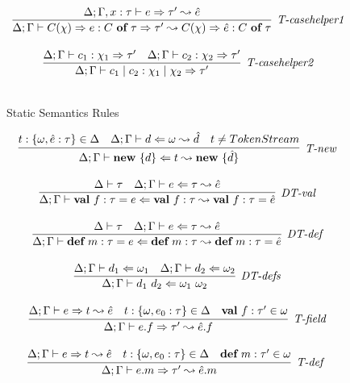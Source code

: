 \begin{figure}
\[\begin{array}{c}
\infer[\textit{T-casehelper1}]
	{\Delta; \Gamma \vdash  C(\chi)\Rightarrow e : C\ \keyw{of}\ \tau \Rightarrow \tau' \leadsto C(\chi)\Rightarrow \hat{e} : C\ \keyw{of}\ \tau} 
	{\Delta; \Gamma, x:\tau \vdash e \Rightarrow \tau' \leadsto \hat{e}}\\[3ex]

\infer[\textit{T-casehelper2}]
	{\Delta; \Gamma \vdash  c_1 \bnfalt c_2: \chi_1 \bnfalt \chi_2 \Rightarrow \tau' } 
	{\Delta; \Gamma \vdash c_1:\chi_1 \Rightarrow \tau' & \Delta; \Gamma \vdash c_2:\chi_2 \Rightarrow \tau'}\\[3ex]


\end{array}
\]
\label{fig:statics1}
\caption{Static Semantics Rules}
\end{figure}

\begin{figure}
\centering
\[
\begin{array}{c}

\infer[\textit{T-new}]
	{\Delta; \Gamma \vdash \keyw{new}\ \{ d \} \Leftarrow  t \leadsto \keyw{new}\ \{\hat d\}}
	{ t:\{\omega, \hat e:\tau\} \in \Delta & \Delta;\Gamma \vdash d \Leftarrow \omega \leadsto \hat d & t\neq TokenStream} \\[3ex]

\infer[\textit{DT-val}]
	{\Delta; \Gamma \vdash \keyw{val}~ f:\tau = e \Leftarrow \keyw{val}~ f:\tau  \leadsto \keyw{val}~ f:\tau = \hat{e}}
	{\Delta \vdash \tau &\Delta; \Gamma \vdash e \Leftarrow \tau \leadsto \hat{e} } \\[3ex]
	
\infer[\textit{DT-def}]
	{\Delta; \Gamma \vdash \keyw{def}~ m:\tau = e \Leftarrow \keyw{def}~ m:\tau \leadsto \keyw{def}~ m:\tau = \hat{e} }
	{\Delta \vdash \tau  & \Delta; \Gamma \vdash e  \Leftarrow \tau \leadsto \hat{e} } \\[3ex]

	
\infer[\textit{DT-defs}]
	{\Delta; \Gamma \vdash d_1\ d_2 \Leftarrow \omega_1\ \omega_2 }
	{\Delta; \Gamma \vdash d_1 \Leftarrow \omega_1 &  \Delta; \Gamma \vdash d_2 \Leftarrow \omega_2 } \\[3ex]


\infer[\textit{T-field}]
	{\Delta; \Gamma \vdash  e.f \Rightarrow \tau' \leadsto \hat{e}.f} 
	{\Delta; \Gamma \vdash e \Rightarrow t \leadsto \hat{e} & t:\{\omega, e_0:\tau\}\in \Delta & \keyw{val}\ f:\tau' \in \omega  }\\[3ex]

 
\infer[\textit{T-def }]
	{\Delta; \Gamma \vdash  e.m \Rightarrow \tau' \leadsto \hat{e}.m} 
	{\Delta; \Gamma \vdash e \Rightarrow t \leadsto \hat{e} & t: \{\omega, e_0:\tau\} \in \Delta & \keyw{def}\ m:\tau' \in \omega }\\[3ex]


\end{array}\]
\end{figure}
